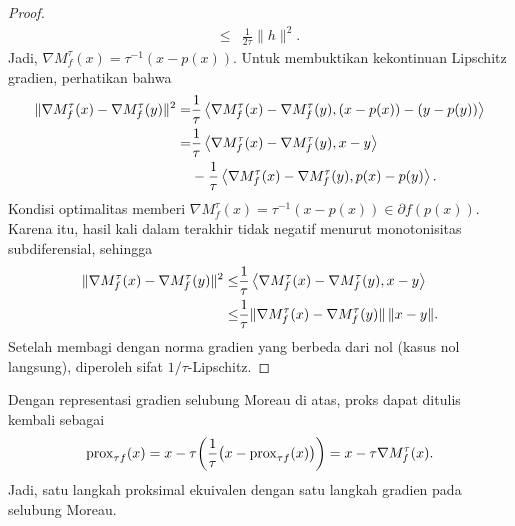 \begin{proof}
\begin{equation}
\begin{aligned}
            \leq&\frac{1}{2\tau}\|h\|^2.
        \end{aligned}
    \end{equation}
    Jadi, \(\nabla M_f^\tau(x)=\tau^{-1}(x-p(x))\). Untuk membuktikan kekontinuan Lipschitz gradien, perhatikan bahwa
    \begin{equation}\label{proximal:eq:moreau_diff2}
        \begin{aligned}
            \|\nabla M_f^\tau(x)-\nabla M_f^\tau(y)\|^2
            =&\frac{1}{\tau}
              \left\langle\nabla M_f^\tau(x)-\nabla M_f^\tau(y) , (x-p(x))-(y-p(y))\right\rangle\\
            =&\frac{1}{\tau}
              \left\langle\nabla M_f^\tau(x)-\nabla M_f^\tau(y) , x-y\right\rangle\\
             &-\frac{1}{\tau}
              \left\langle\nabla M_f^\tau(x)-\nabla M_f^\tau(y) , p(x)-p(y)\right\rangle.
        \end{aligned}
    \end{equation}
    Kondisi optimalitas memberi
    \(\nabla M_f^\tau(x)=\tau^{-1}(x-p(x))\in\partial f(p(x))\).
    Karena itu, hasil kali dalam terakhir tidak negatif menurut monotonisitas subdiferensial, sehingga
    \begin{equation}\label{proximal:eq:moreau_diff2_bound}
        \begin{aligned}
            \|\nabla M_f^\tau(x)-\nabla M_f^\tau(y)\|^2
            \leq&\frac{1}{\tau}
              \left\langle\nabla M_f^\tau(x)-\nabla M_f^\tau(y) , x-y\right\rangle\\
            \leq&\frac{1}{\tau}
              \|\nabla M_f^\tau(x)-\nabla M_f^\tau(y)\|\,\|x-y\|.
        \end{aligned}
    \end{equation}
    Setelah membagi dengan norma gradien yang berbeda dari nol (kasus nol langsung), diperoleh sifat \(1/\tau\)-Lipschitz.
\end{proof}

\begin{rem}
    Dengan representasi gradien selubung Moreau di atas, proks dapat ditulis kembali sebagai
    \begin{equation}
        \mathrm{prox}_{\tau f}(x)
        =x-\tau\biggl(\frac{1}{\tau}\bigl(x-\mathrm{prox}_{\tau f}(x)\bigr)\biggr)
        =x-\tau\nabla M_f^\tau(x).
    \end{equation}
    Jadi, satu langkah proksimal ekuivalen dengan satu langkah gradien pada selubung Moreau.
\end{rem}

